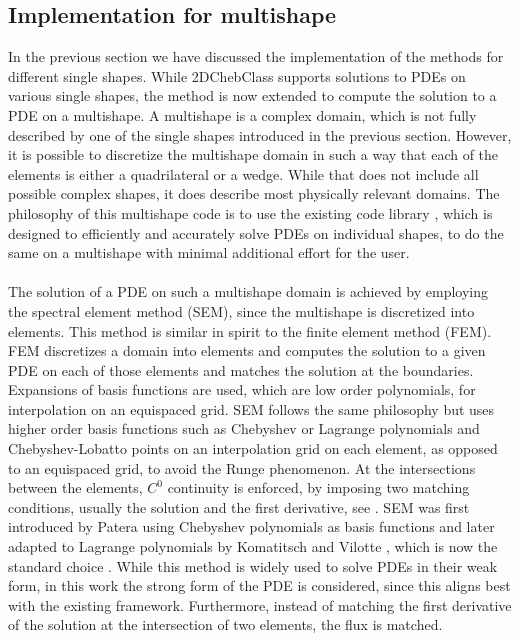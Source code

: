 

\subsection{Implementation for multishape}
In the previous section we have discussed the implementation of the methods for different single shapes. While 2DChebClass supports solutions to PDEs on various single shapes, the method is now extended to compute the solution to a PDE on a multishape. A multishape is a complex domain, which is not fully described by one of the single shapes introduced in the previous section. However, it is possible to discretize the multishape domain in such a way that each of the elements is either a quadrilateral or a wedge. While that does not include all possible complex shapes, it does describe most physically relevant domains. The philosophy of this multishape code is to use the existing code library \cite{GoddardPseudospectralCode1}, which is designed to efficiently and accurately solve PDEs on individual shapes, to do the same on a multishape with minimal additional effort for the user.
\\
\\
The solution of a PDE on such a multishape domain is achieved by employing the spectral element method (SEM), since the multishape is discretized into elements. This method is similar in spirit to the finite element method (FEM). FEM discretizes a domain into elements and computes the solution to a given PDE on each of those elements and matches the solution at the boundaries. Expansions of basis functions are used, which are low order polynomials, for interpolation on an equispaced grid. SEM follows the same philosophy but uses higher order basis functions such as Chebyshev or Lagrange polynomials and Chebyshev-Lobatto points on an interpolation grid on each element, as opposed to an equispaced grid, to avoid the Runge phenomenon. At the intersections between the elements, $C^0$ continuity is enforced, by imposing two matching conditions, usually the solution and the first derivative, see \cite{Boyd1}. SEM was first introduced by Patera \cite{SEMPatera84} using  Chebyshev polynomials as basis functions and later adapted to Lagrange polynomials by Komatitsch and Vilotte \cite{SEMLagrange98}, which is now the standard choice \cite{Boyd1}.
While this method is widely used to solve PDEs in their weak form, in this work the strong form of the PDE is considered, since this aligns best with the existing framework. Furthermore, instead of matching the first derivative of the solution at the intersection of two elements, the flux is matched. 


